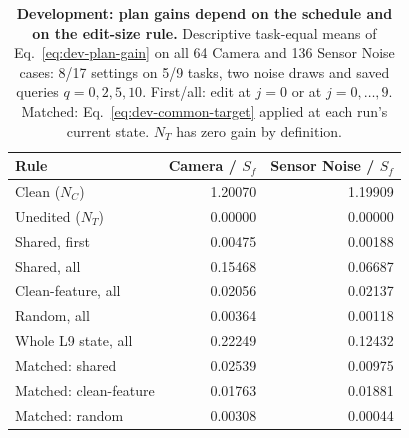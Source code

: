 \begin{table}[t]
\caption{\textbf{Development: plan gains depend on the schedule and on the edit-size rule.} Descriptive task-equal means of Eq.~\ref{eq:dev-plan-gain} on all 64 Camera and 136 Sensor Noise cases: 8/17 settings on 5/9 tasks, two noise draws and saved queries $q=0,2,5,10$. First/all: edit at $j=0$ or at $j=0,\ldots,9$. Matched: Eq.~\ref{eq:dev-common-target} applied at each run's current state. $N_T$ has zero gain by definition.}

\centering\small
\begin{tabular}{lrr}\toprule
Rule & Camera / $S_f$ & Sensor Noise / $S_f$\\\midrule
Clean ($N_C$) & 1.20070 & 1.19909\\
Unedited ($N_T$) & 0.00000 & 0.00000\\
\midrule
Shared, first & 0.00475 & 0.00188\\
Shared, all & 0.15468 & 0.06687\\
Clean-feature, all & 0.02056 & 0.02137\\
Random, all & 0.00364 & 0.00118\\
Whole L9 state, all & 0.22249 & 0.12432\\
\midrule
Matched: shared & 0.02539 & 0.00975\\
Matched: clean-feature & 0.01763 & 0.01881\\
Matched: random & 0.00308 & 0.00044\\
\bottomrule\end{tabular}

\label{tab:dev-restoration-controls}
\end{table}
